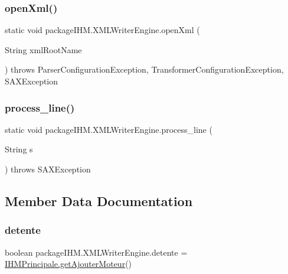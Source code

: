 \subsubsection{\texorpdfstring{open\+Xml()}{openXml()}}
{\footnotesize\ttfamily static void package\+I\+H\+M.\+X\+M\+L\+Writer\+Engine.\+open\+Xml (\begin{DoxyParamCaption}\item[{String}]{xml\+Root\+Name }\end{DoxyParamCaption}) throws Parser\+Configuration\+Exception, Transformer\+Configuration\+Exception, S\+A\+X\+Exception\hspace{0.3cm}{\ttfamily [static]}}

\mbox{\label{classpackage_i_h_m_1_1_x_m_l_writer_engine_ac18b22451d5382bfd52862c7c409334d}} 
\subsubsection{\texorpdfstring{process\+\_\+line()}{process\_line()}}
{\footnotesize\ttfamily static void package\+I\+H\+M.\+X\+M\+L\+Writer\+Engine.\+process\+\_\+line (\begin{DoxyParamCaption}\item[{String}]{s }\end{DoxyParamCaption}) throws S\+A\+X\+Exception\hspace{0.3cm}{\ttfamily [static]}}



\subsection{Member Data Documentation}
\mbox{\label{classpackage_i_h_m_1_1_x_m_l_writer_engine_a085cb96009b631ffd6a02feb519edb17}} 
\subsubsection{\texorpdfstring{detente}{detente}}
{\footnotesize\ttfamily boolean package\+I\+H\+M.\+X\+M\+L\+Writer\+Engine.\+detente = \mbox{\hyperlink{classpackage_i_h_m_1_1_i_h_m_principale_a35c976eb40d2eef2dbb89b2b0befb0fb}{I\+H\+M\+Principale.\+get\+Ajouter\+Moteur}}()\hspace{0.3cm}{\ttfamily [static]}}



